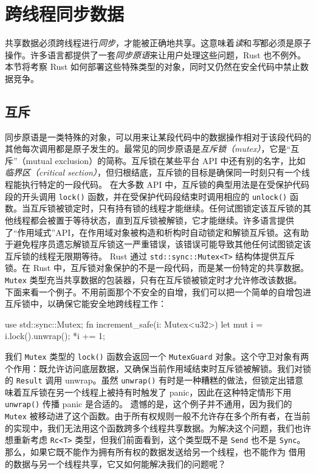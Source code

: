 \section{跨线程同步数据}
\label{idx:idx_cbc641b6}
共享数据必须跨线程进行\emph{同步}，才能被正确地共享。这意味着\emph{读}和\emph{写}都必须是原子操作。许多语言都提供了一套\emph{同步原语}来让用户处理这些问题，Rust 也不例外。本节将考察 Rust 如何部署这些特殊类型的对象，同时又仍然在安全代码中禁止数据竞争。
\subsection{互斥}
\label{idx:idx_6cff257d}
\label{idx:idx_e94f5196}
同步原语是一类特殊的对象，可以用来让某段代码中的数据操作相对于该段代码的其他每次调用都是原子发生的。最常见的同步原语是\emph{互斥锁（mutex）}，它是“互斥”（mutual exclusion）的简称。互斥锁在某些平台 API 中还有别的名字，比如\emph{临界区（critical section）}，但归根结底，互斥锁的目标是确保同一时刻只有一个线程能执行特定的一段代码。
在大多数 API 中，互斥锁的典型用法是在受保护代码段的开头调用 \texttt{lock()} 函数，并在受保护代码段结束时调用相应的 \texttt{unlock()} 函数。当互斥锁被锁定时，只有持有锁的线程才能继续。任何试图锁定该互斥锁的其他线程都会被置于等待状态，直到互斥锁被解锁，它才能继续。许多语言提供了“作用域式”API，在作用域对象被构造和析构时自动锁定和解锁互斥锁。这有助于避免程序员遗忘解锁互斥锁这一严重错误，该错误可能导致其他任何试图锁定该互斥锁的线程无限期等待。
\label{idx:idx_84aa00f2}
\label{idx:idx_d6c1cdef}
Rust 通过 \texttt{std::\allowbreak{}sync::\allowbreak{}Mutex<\allowbreak{}T>\allowbreak{}} 结构体提供互斥锁。在 Rust 中，互斥锁对象保护的不是一段代码，而是某一份特定的共享数据。\texttt{Mutex} 类型充当共享数据的包装器，只有在互斥锁被锁定时才允许修改该数据。
下面来看一个例子。不用前面那个不安全的自增，我们可以把一个简单的自增包进互斥锁中，以确保它能安全地跨线程工作：
\begin{codebox}[rust]
use std::sync::Mutex;
fn increment_safe(i: Mutex<u32>) {
    let mut i = i.lock().unwrap();
    *i += 1;
}
\end{codebox}
我们 \texttt{Mutex} 类型的 \texttt{lock()} 函数会返回一个 \texttt{MutexGuard} 对象。这个守卫对象有两个作用：既允许访问底层数据，又确保当前作用域结束时互斥锁被解锁。我们对锁的 \texttt{Result} 调用 unwrap。虽然 \texttt{unwrap()} 有时是一种糟糕的做法，但锁定出错意味着互斥锁在另一个线程上被持有时触发了 panic，因此在这种特定情形下用 \texttt{unwrap()} 传播 panic 是合适的。
\label{idx:idx_5be70179}
\label{idx:idx_72ed3555}
遗憾的是，这个例子并不通用，因为我们的 \texttt{Mutex} 被移动进了这个函数。由于所有权规则一般不允许存在多个所有者，在当前的实现中，我们无法用这个函数跨多个线程共享数据。为解决这个问题，我们也许想重新考虑 \texttt{Rc<T>} 类型，但我们前面看到，这个类型既不是 \texttt{Send} 也不是
\texttt{Sync}。那么，如果它既不能作为拥有所有权的数据发送给另一个线程，也不能作为
借用的数据与另一个线程共享，它又如何能解决我们的问题呢？
